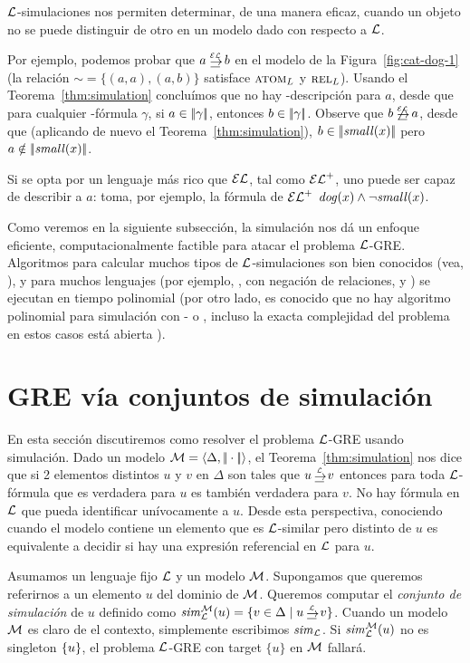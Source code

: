 $\mathcal{L}$-simulaciones nos permiten determinar, de una manera eficaz,
cuando un objeto no se puede distinguir de otro en un modelo dado con respecto a $\mathcal{L}$.

Por ejemplo, podemos probar que $a \simul{\EL} b$ en el modelo de la 
Figura~\ref{fig:cat-dog-1} (la relaci\'on ${\sim} = \{(a,a), (a, b) \}
$ satisface $\textsc{atom}_L$ y $\textsc{rel}_L$).
Usando el Teorema~\ref{thm:simulation} conclu\'imos que no hay
 \EL-descripci\'on para $a$, desde que para cualquier \EL-f\'ormula $\gamma$,
si $a\in|\!|\gamma|\!|$, entonces $b\in|\!|\gamma|\!|$.
Observe que $b \not\simul{\EL} a$, desde que
(aplicando de nuevo el Teorema~\ref{thm:simulation}), $b\in|\!|\mathit{small}(x)|\!|$ pero
$a\notin|\!|\mathit{small}(x)|\!|$.
%

Si se opta por un lenguaje m\'as rico que $\mathcal{EL}$, tal como ${\mathcal{EL}^+}$, uno puede ser
capaz de describir a $a$: toma, por ejemplo, la f\'ormula de ${\mathcal{EL}^+}$
$\mathit{dog}(x)\wedge\lnot\mathit{small}(x)$.


Como veremos en la siguiente subsecci\'on, la simulaci\'on nos d\'a un
enfoque eficiente, computacionalmente factible para atacar el problema $\mathcal{L}$-GRE. Algoritmos para calcular muchos tipos de $\mathcal{L}$-simulaciones son
bien conocidos (vea, \cite{H71,areces08,HHK95,DPP03}), y para muchos
lenguajes (por ejemplo, \ALC, \ALC con negaci\'on de relaciones, \ELAN y \EL)
se ejecutan en tiempo polinomial (por otro lado, es conocido que no hay algoritmo polinomial 
 para simulaci\'on con \FOL- o \EPFOL, incluso la exacta
complejidad del problema en estos casos est\'a abierta \cite{gare:comp79}).

\section{GRE v\'ia conjuntos de simulaci\'on}\label{sec:simulation}

En esta secci\'on discutiremos como resolver el problema $\mathcal{L}$-GRE
usando simulaci\'on. Dado un modelo $\mathcal{M} = \langle \Delta,
|\!|\cdot|\!| \rangle$, el Teorema~\ref{thm:simulation} nos dice que si 2 elementos distintos $u$ y $v$ en $\Delta$ son tales que $u
\simul{\+L} v$ entonces para toda $\mathcal{L}$-f\'ormula que es verdadera para $u$ es tambi\'en verdadera para $v$. No hay f\'ormula en $\mathcal{L}$ que pueda identificar un\'ivocamente a $u$. Desde esta perspectiva, conociendo cuando el modelo contiene un elemento que es $\mathcal{L}$-similar pero distinto de $u$ es
equivalente a decidir si hay una expresi\'on referencial en $\mathcal{L}$ para $u$.


Asumamos un lenguaje fijo $\mathcal{L}$ y un modelo $\mathcal{M}$. Supongamos que queremos referirnos a un elemento $u$ del dominio de $\mathcal{M}$. Queremos computar el \emph{conjunto de simulaci\'on} de $u$ definido como
$\simset_{\+L}^{\+M}(u) = \cset{v \in \Delta \mid u \simul{\+L} v}$.
Cuando un modelo $\mathcal{M}$ es claro de el contexto, simplemente escribimos ${\it sim}_{\mathcal{L}}$.
 Si ${\it sim}_{\mathcal{L}}^{\mathcal{M}}(u)$ no es singleton $\{u\}$,
el problema $\mathcal{L}$-GRE con target $\{u\}$ en $\mathcal{M}$ fallar\'a.

